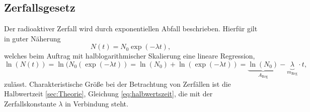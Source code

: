 \subsection{Zerfallsgesetz}
Der radioaktiver Zerfall wird durch exponentiellen Abfall beschrieben.
Hierfür gilt in guter Näherung
\begin{equation}
	N(t)=N_0 \exp(-\lambda t),
	\label{eq:Zerfallsgesetz}
\end{equation}
welches beim Auftrag mit halblogarithmischer Skalierung eine lineare Regression,
\begin{equation}
	\ln(N(t))=\ln(N_0(\exp(-\lambda t))=\ln(N_0)+\ln(\exp(-\lambda t)) =\underbrace{\ln(N_0)}_{A_\text{Reg}}-\underbrace{\lambda}_{m_\text{Reg}} \cdot t,
	\label{eq:Zerfallsgesetz_linear}
\end{equation}
zulässt.
Charakteristische Größe bei der Betrachtung von Zerfällen ist die Halbwertzeit \ref{sec:Theorie}, Gleichung \eqref{eq:halbwertszeit}, die mit der Zerfallskonstante $\lambda$ in Verbindung steht.

